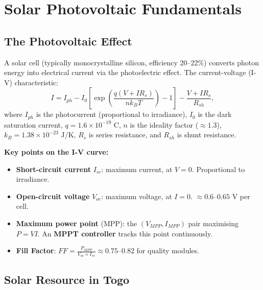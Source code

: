 \documentclass[12pt,a4paper,openany]{book}
\begin{document}
\chapter{Solar Photovoltaic Fundamentals}
\label{chap:solar_basics}

\section{The Photovoltaic Effect}

A solar cell (typically monocrystalline silicon, efficiency 20--22\%) converts photon energy into electrical current via the photoelectric effect. The current-voltage (I-V) characteristic:
\begin{equation}
  I = I_{ph} - I_0\left[\exp\!\left(\frac{q(V+IR_s)}{nk_BT}\right)-1\right] - \frac{V+IR_s}{R_{sh}},
\end{equation}
where $I_{ph}$ is the photocurrent (proportional to irradiance), $I_0$ is the dark saturation current, $q=1.6\times10^{-19}$ C, $n$ is the ideality factor ($\approx1.3$), $k_B=1.38\times10^{-23}$ J/K, $R_s$ is series resistance, and $R_{sh}$ is shunt resistance.

\textbf{Key points on the I-V curve:}
\begin{itemize}[leftmargin=2em]
  \item \textbf{Short-circuit current} $I_{sc}$: maximum current, at $V=0$. Proportional to irradiance.
  \item \textbf{Open-circuit voltage} $V_{oc}$: maximum voltage, at $I=0$. $\approx0.6$--$0.65$ V per cell.
  \item \textbf{Maximum power point} (MPP): the $(V_{MPP},I_{MPP})$ pair maximising $P=VI$. An \textbf{MPPT controller} tracks this point continuously.
  \item \textbf{Fill Factor}: $FF=\frac{P_{MPP}}{V_{oc}\times I_{sc}}\approx0.75$--$0.82$ for quality modules.
\end{itemize}

\section{Solar Resource in Togo}
\end{document}
